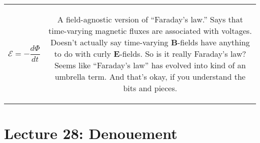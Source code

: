 \documentclass{article}
\numberwithin{equation}{section}
\begin{document}
\begin{table}[H]
\begin{tabular}{@{}c|c@{}}
{\begin{equation*}
    \mathcal{E} = -\frac{d\Phi}{dt}
\end{equation*}} & \parbox[c]{0.5\textwidth}{\begin{center}
    A field-agnostic version of ``Faraday's law.'' Says that time-varying magnetic fluxes are associated with voltages. Doesn't actually say time-varying $\bm{B}$-fields have anything to do with curly $\bm{E}$-fields. So is it really Faraday's law? Seems like ``Faraday's law'' has evolved into kind of an umbrella term. And that's okay, if you understand the bits and pieces.
\end{center}} \\ \bottomrule
\end{tabular}
\label{tab:27:five}
\end{table}

\newpage

\section*{Lecture 28: Denouement}
\setcounter{page}{1}

\newpage
\end{document}
